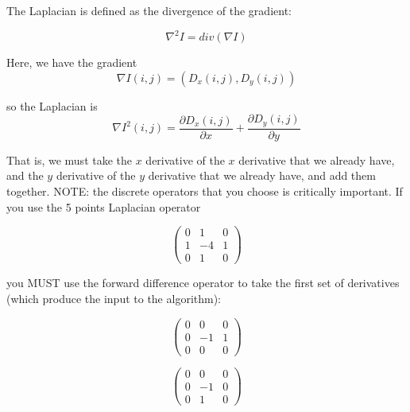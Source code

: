 \documentclass{InsightArticle}
\begin{document}
The Laplacian is defined as the divergence of the gradient:

\begin{equation}
\nabla^2 I = div(\nabla I)
\end{equation}

Here, we have the gradient 
\begin{equation}
\nabla I (i,j) = (D_x(i,j), D_y(i,j)) 
\end{equation}

so the Laplacian is 
\begin{equation}
\nabla I^2(i,j) = \frac{\partial D_x(i,j)}{\partial x} + \frac{\partial D_y(i,j)}{\partial y}
\end{equation}

That is, we must take the $x$ derivative of the $x$ derivative that we already have, and the $y$ derivative of the $y$ derivative that we already have, and add them together. NOTE: the discrete operators that you choose is critically important. If you use the 5 points Laplacian operator

\begin{equation}
\begin{pmatrix}
0 & 1 & 0 \\
1 & -4 & 1\\
0 & 1 & 0
\end{pmatrix}
\end{equation}

you MUST use the forward difference operator to take the first set of derivatives (which produce the input to the algorithm):

\begin{figure}[H]
  \begin{minipage}[b]{0.5\linewidth}
    \centering

    \begin{equation}
    \begin{pmatrix}
    0 & 0 & 0 \\
    0 & -1 & 1\\
    0 & 0 & 0
    \end{pmatrix}
    \end{equation}

  \end{minipage}
    \hspace{0.5cm}
  \begin{minipage}[b]{0.5\linewidth}

    \begin{equation}
    \begin{pmatrix}
    0 & 0 & 0 \\
    0 & -1 & 0\\
    0 & 1 & 0
    \end{pmatrix}
    \end{equation}
  \end{minipage}
\end{figure}
\end{document}
